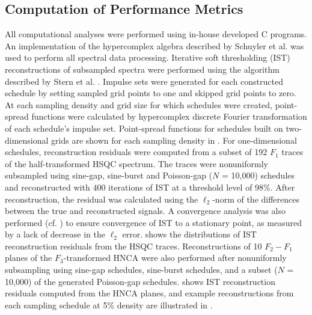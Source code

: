 \subsection{Computation of Performance Metrics}

\begin{doublespace}
All computational analyses were performed using in-house developed C programs.
An implementation of the hypercomplex algebra described by Schuyler et al.
\cite{schuyler:jmr2013} was used to perform all spectral data processing.
Iterative soft thresholding (IST) reconstructions of subsampled spectra were
performed using the algorithm described by Stern et al.
\cite{stern:jmr2007,sun:jbnmr2015}. Impulse sets were generated for each
constructed schedule by setting sampled grid points to one and skipped
grid points to zero. At each sampling density and grid size for which schedules
were created, point-spread functions were calculated by hypercomplex discrete
Fourier transformation of each schedule's impulse set. Point-spread functions
for schedules built on two-dimensional grids are shown for each sampling
density in . For one-dimensional schedules,
reconstruction residuals were computed from a subset of 192 $F_1$ traces of
the half-transformed HSQC spectrum. The traces were nonuniformly subsampled
using sine-gap, sine-burst and Poisson-gap ($N$ = 10,000) schedules and
reconstructed with 400 iterations of IST at a threshold level of 98\%.
After reconstruction, the residual was calculated using the $\ell_2$-norm of
the differences between the true and reconstructed signals. A convergence
analysis was also performed (cf. ) to ensure
convergence of IST to a stationary point, as measured by a lack of decrease
in the $\ell_2$ error.  shows the distributions of
IST reconstruction residuals from the HSQC traces. Reconstructions
of 10 $F_2-F_1$ planes of the $F_3$-transformed HNCA were also performed
after nonuniformly subsampling using sine-gap schedules, sine-burst
schedules, and a subset ($N$ = 10,000) of the generated Poisson-gap
schedules.  shows IST reconstruction residuals
computed from the HNCA planes, and example reconstructions from each
sampling schedule at 5\% density are illustrated in
.
\end{doublespace}

